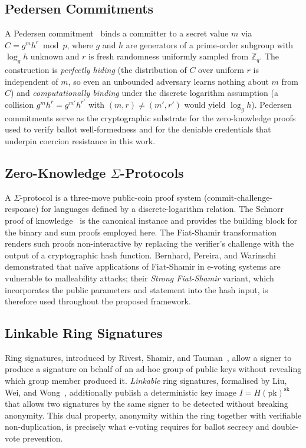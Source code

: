 \subsection{Pedersen Commitments}
\label{subsec:bg-pedersen}

A Pedersen commitment~\cite{pedersen1991} binds a committer to a secret value $m$ via $C = g^m h^r \bmod p$, where $g$ and $h$ are generators of a prime-order subgroup with $\log_g h$ unknown and $r$ is fresh randomness uniformly sampled from $\mathbb{Z}_q$. The construction is \emph{perfectly hiding} (the distribution of $C$ over uniform $r$ is independent of $m$, so even an unbounded adversary learns nothing about $m$ from $C$) and \emph{computationally binding} under the discrete logarithm assumption (a collision $g^m h^r = g^{m'} h^{r'}$ with $(m,r) \neq (m',r')$ would yield $\log_g h$). Pedersen commitments serve as the cryptographic substrate for the zero-knowledge proofs used to verify ballot well-formedness and for the deniable credentials that underpin coercion resistance in this work.

\subsection{Zero-Knowledge \texorpdfstring{$\Sigma$}{Sigma}-Protocols}
\label{subsec:bg-zkp}

A $\Sigma$-protocol is a three-move public-coin proof system (commit-challenge-response) for languages defined by a discrete-logarithm relation. The Schnorr proof of knowledge~\cite{schnorr1991} is the canonical instance and provides the building block for the binary and sum proofs employed here. The Fiat-Shamir transformation~\cite{fiat_shamir1986} renders such proofs non-interactive by replacing the verifier's challenge with the output of a cryptographic hash function. Bernhard, Pereira, and Warinschi~\cite{bernhard2012} demonstrated that na\"ive applications of Fiat-Shamir in e-voting systems are vulnerable to malleability attacks; their \emph{Strong Fiat-Shamir} variant, which incorporates the public parameters and statement into the hash input, is therefore used throughout the proposed framework.

\subsection{Linkable Ring Signatures}
\label{subsec:bg-ring}

Ring signatures, introduced by Rivest, Shamir, and Tauman~\cite{rivest2001ring}, allow a signer to produce a signature on behalf of an ad-hoc group of public keys without revealing which group member produced it. \emph{Linkable} ring signatures, formalised by Liu, Wei, and Wong~\cite{liu2004}, additionally publish a deterministic key image $I = H(\text{pk})^{\text{sk}}$ that allows two signatures by the same signer to be detected without breaking anonymity. This dual property, anonymity within the ring together with verifiable non-duplication, is precisely what e-voting requires for ballot secrecy and double-vote prevention.


